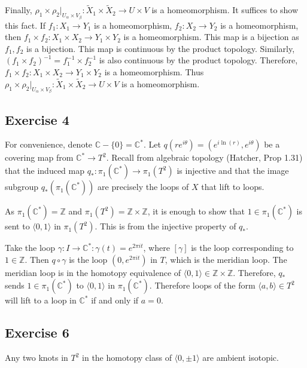 \documentclass{article}
\theoremstyle{definition}
\numberwithin{theorem}{section}
\numberwithin{equation}{section}
\newcommand{\cover}{\widetilde{X}}
\begin{document}
Finally, $\rho_1 \times \rho_2 |_{U_\alpha \times V_\beta}: \cover_1 \times \cover_2 \rightarrow U \times V$ is a homeomorphism. It suffices to show this fact. If $f_1 : X_1 \rightarrow Y_1$ is a homeomorphism, $f_2 : X_2 \rightarrow Y_2$ is a homeomorphism, then $f_1 \times f_2 : X_1 \times X_2 \rightarrow Y_1 \times Y_2$ is a homeomorphism. This map is a bijection as $f_1, f_2$ is a bijection. This map is continuous by the product topology. Similarly,$(f_1 \times f_2 )^{-1} = f_1^{-1} \times f_2^{-1}$ is also continuous by the product topology. Therefore, $f_1 \times f_2 : X_1 \times X_2 \rightarrow Y_1 \times Y_2$ is a homeomorphism. Thus $\rho_1 \times \rho_2 |_{U_\alpha \times V_\beta}: \cover_1 \times \cover_2 \rightarrow U \times V$ is a homeomorphism. 

\subsection{Exercise 4}
For convenience, denote $\mathbb{C} - \{0\} = \mathbb{C}^*$. 
Let $q(r e^{i \theta}) = (e^{i \ln(r)}, e^{i \theta})$ be a covering map from $\mathbb{C}^* \rightarrow T^2$. Recall from algebraic topology (Hatcher, Prop 1.31) that the induced map $q_* : \pi_1(\mathbb{C}^*) \rightarrow \pi_1(T^2)$ is injective and that the image subgroup $q_*(\pi_1(\mathbb{C}^*))$ are precisely the loops of $X$ that lift to loops. 

As $\pi_1(\mathbb{C}^*) = \mathbb{Z}$ and $\pi_1(T^2) = \mathbb{Z} \times \mathbb{Z}$, it is enough to show that $1 \in \pi_1(\mathbb{C}^*)$ is sent to $\langle 0, 1 \rangle$ in $\pi_1(T^2)$. This is from the injective property of $q_*$. 

Take the loop $\gamma : I \rightarrow \mathbb{C}^*: \gamma(t) = e^{2 \pi i t}$, where $[\gamma]$ is the loop corresponding to $1 \in \mathbb{Z}$. Then $q \circ \gamma$ is the loop $(0, e^{2 \pi i t})$ in $T$, which is the meridian loop. The meridian loop is in the homotopy equivalence of $\langle 0, 1 \rangle \in \mathbb{Z} \times \mathbb{Z}$. Therefore, $q_\ast$ sends $1 \in \pi_1(\mathbb{C}^*)$ to $\langle 0, 1 \rangle$ in $\pi_1(\mathbb{C}^*)$. Therefore loops of the form $ \langle a, b \rangle \in T^2$ will lift to a loop in $\mathbb{C}^*$ if and only if $a = 0$.

\subsection{Exercise 6}

Any two knots in $T^2$ in the homotopy class of $\langle 0, \pm 1 \rangle$ are ambient isotopic.
\end{document}
